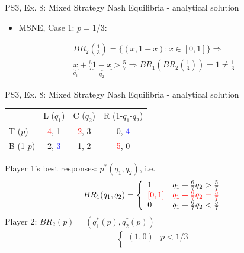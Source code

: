 \begin{frame}{PS3, Ex. 8: Mixed Strategy Nash Equilibria - analytical solution}
\begin{multicols}{2}
    \vspace{-8pt}
    \begin{itemize}
      \item MSNE, Case 1: $p=1/3:$
    \end{itemize}
    \vspace{-10pt}
    \begin{align*}
      BR_2\left(\frac{1}{3}\right)=\{(x,1-x):x\in[0,1]\}\Rightarrow\\
      \underbrace{x}_{q_1} + \frac{6}{7}\underbrace{1-x}_{q_2} > \frac{5}{7} \Rightarrow BR_1\left(BR_2(\frac{1}{3})\right)=1\neq\frac{1}{3}
    \end{align*}
  \vfill\null
  \end{multicols}
\end{frame}
\begin{frame}{PS3, Ex. 8: Mixed Strategy Nash Equilibria - analytical solution}
  \begin{multicols}{2}
    \begin{table}
      \begin{tabular}{l|c|c|c|}
          \multicolumn{1}{c}{}  & \multicolumn{1}{c}{L ($q_1$)} & \multicolumn{1}{c}{C ($q_2$)} & \multicolumn{1}{c}{R (1-$q_1$-$q_2$)} \\\cline{2-4}
          T ($p$)   & \textcolor{red}{4}, 1 & \textcolor{red}{2}, 3 & 0, \textcolor{blue}{4} \\\cline{2-4}
          B (1-$p$) & 2, \textcolor{blue}{3} & 1, 2 & \textcolor{red}{5}, 0 \\\cline{2-4}
      \end{tabular}
    \end{table}
    Player 1's best responses: $p^{*}(q_1,q_2)$, i.e.
    \begin{align*}
      BR_1(q_1,q_2)=
      \left\{ \begin{array}{ll}
          1                 & q_1 + \frac{6}{7}q_2 > \frac{5}{7}\\
          \textcolor{red}{\left[0,1\right]}  & \textcolor{red}{q_1 + \frac{6}{7}q_2 = \frac{5}{7}}\\
          0                 & q_1 + \frac{6}{7}q_2 < \frac{5}{7}
      \end{array}\right.
    \end{align*}
    Player 2: $BR_2(p)=\left(q_1^{*}(p),q_2^{*}(p)\right)=$
    \begin{align*}
      \left\{ \begin{array}{ll}
          (1,0)                 & p < 1/3 \\

\end{array}
\end{align*}
\end{multicols}
\end{frame}
